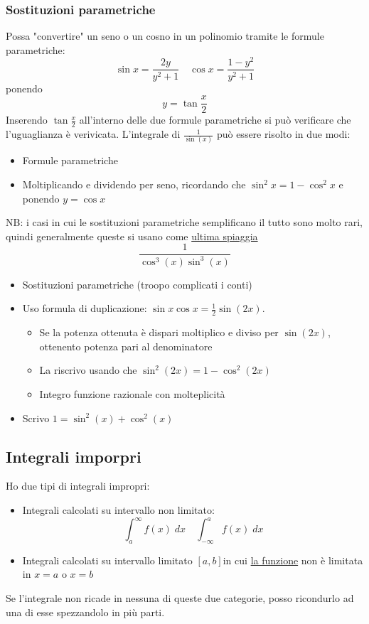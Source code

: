 \subsubsection*{Sostituzioni parametriche}
Possa "convertire" un seno o un cosno in un polinomio tramite le formule parametriche:
\[
	\sin x = \frac{2y}{y^2 + 1} \quad \cos  x = \frac{1- y^2}{y^2 + 1}
\]
ponendo
\[
	y= \tan  \frac{x}{2}
\]
Inserendo $ \tan \frac{x}{2} $ all'interno delle due formule parametriche si può verificare che l'uguaglianza è verivicata. L'integrale di $ \frac{1}{\sin \left( x \right) } $ può essere risolto in due modi:
\begin{itemize}
	\item Formule parametriche
	\item Moltiplicando e dividendo per seno, ricordando che $ \sin ^2 x  = 1- \cos ^2 x$ e ponendo $ y=\cos x $
\end{itemize}
NB: i casi in cui le sostituzioni parametriche semplificano il tutto sono molto rari, quindi generalmente queste si usano come \underline{ultima spiaggia}
\hr
\[
	\boxed{\frac{1}{ \cos ^3 \left( x \right) \sin ^3 \left( x \right) }}
\]
\begin{itemize}
	\item Sostituzioni parametriche (troopo complicati i conti)
	\item Uso formula di duplicazione: $ \sin x \cos x = \frac{1}{2} \sin  \left( 2x \right)  $.
	      \begin{itemize}
		      \item	Se la potenza ottenuta è dispari moltiplico e diviso per $ \sin \left( 2x \right)  $, ottenento potenza pari al denominatore
		      \item La riscrivo usando che $ \sin ^2 \left( 2x \right) = 1- \cos ^2\left( 2x \right)  $
		      \item	Integro funzione razionale con molteplicità
	      \end{itemize}
	\item Scrivo $ 1=\sin ^2 \left( x \right)  + \cos  ^2 \left( x \right)  $
\end{itemize}
\subsection{Integrali imporpri}
Ho due tipi di integrali impropri:
\begin{itemize}
	\item Integrali calcolati su intervallo non limitato:
	      \[
		      \int_{a}^{\infty} f\left( x \right)  \; dx \quad \int_{-\infty}^{a} f\left( x \right)  \; dx
	      \]
	\item Integrali calcolati su intervallo limitato $ \left[ a,b \right]  $in cui \underline{la funzione} non è limitata in $ x=a $ o $ x=b $
\end{itemize}
Se l'integrale non ricade in nessuna di queste due categorie, posso ricondurlo ad una di esse spezzandolo in più parti.
